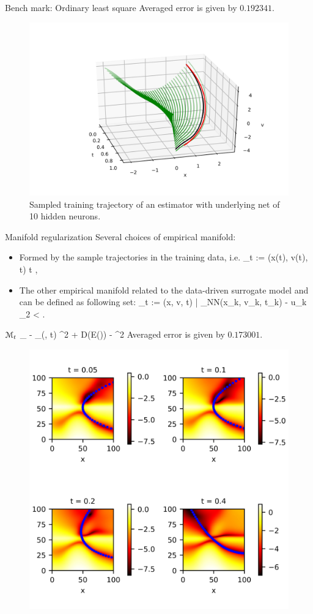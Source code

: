 \documentclass{beamer}
\begin{document}
\begin{frame}{Bench mark: Ordinary least square}
	Averaged error is given by $0.192341$.
	\begin{figure}[H]
          \centering
          \centerline{\includegraphics[width=0.7\linewidth]{fig/control1-1.jpg}}
          \caption{Sampled training trajectory of an estimator with underlying net of 		10 hidden neurons.}
	\end{figure}
\end{frame}


\begin{frame}{Manifold regularization}
	Several choices of empirical manifold:
	\begin{itemize}
		\item Formed by the sample trajectories in the training data, i.e.
	\bequn
		\mcM_t := \lbb (x(t), v(t), t)  \quad t \in [0, 1]  \rbb,
	\eequn
		\item The other empirical manifold related to the data-driven surrogate model
		 and can be defined as following set:
\bequn
	\wht \mcM_t := \lbb (x, v, t) \Big| \norml \phi_{NN}(x_k, v_k, t_k) - u_k \normr_2 < \epsilon \rbb.
\eequn
	
\end{itemize}
\end{frame}


\begin{frame}{$ \mathcal{M}_t $}
\bequn
		\min_{\theta} \mbE \norml \mfu - \phi_{\theta}(\mfx, t) \normr^2 + \lambda
		 \norml D(E(\wht \mfx)) - \wht \mfx \normr^2
	\eequn
	Averaged error is given by $0.173001$.
	\begin{figure}[H]
          \centering
          \centerline{\includegraphics[width=0.65\linewidth]{fig/control6.jpg}}
          \label{l2-mfd}
\end{figure}
\end{frame}
\end{document}
